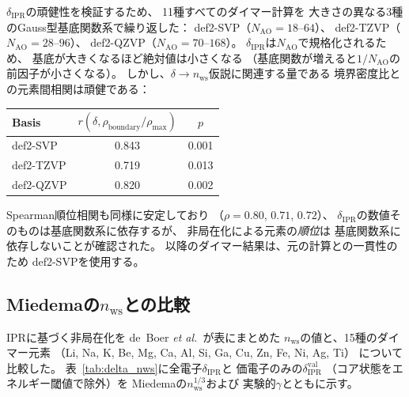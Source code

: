 \documentclass[twocolumn,showpacs,preprintnumbers,amsmath,amssymb,prb]{revtex4-2}
\begin{document}
$\delta_\mathrm{IPR}$の頑健性を検証するため、
11種すべてのダイマー計算を
大きさの異なる3種のGauss型基底関数系で繰り返した：
def2-SVP（$N_\mathrm{AO} = 18$--$64$）、
def2-TZVP（$N_\mathrm{AO} = 28$--$96$）、
def2-QZVP（$N_\mathrm{AO} = 70$--$168$）。
$\delta_\mathrm{IPR}$は$N_\mathrm{AO}$で規格化されるため、
基底が大きくなるほど絶対値は小さくなる
（基底関数が増えると$1/N_\mathrm{AO}$の前因子が小さくなる）。
しかし、$\delta \to n_\mathrm{ws}$仮説に関連する量である
境界密度比との元素間相関は頑健である：
\begin{center}
\begin{tabular}{lcc}
  Basis & $r(\delta, \rho_\mathrm{boundary}/\rho_\mathrm{max})$ & $p$ \\
  \hline
  def2-SVP  & 0.843 & 0.001 \\
  def2-TZVP & 0.719 & 0.013 \\
  def2-QZVP & 0.820 & 0.002 \\
\end{tabular}
\end{center}
Spearman順位相関も同様に安定しており
（$\rho = 0.80$, $0.71$, $0.72$）、
$\delta_\mathrm{IPR}$の数値そのものは基底関数系に依存するが、
非局在化による元素の\emph{順位}は
基底関数系に依存しないことが確認された。
以降のダイマー結果は、元の計算との一貫性のため
def2-SVPを使用する。

\subsection{Miedemaの$n_\mathrm{ws}$との比較}

IPRに基づく非局在化を
de~Boer \textit{et al.}~\cite{deBoer1988}が表にまとめた
$n_\mathrm{ws}$の値と、15種のダイマー元素
（Li, Na, K, Be, Mg, Ca, Al, Si, Ga, Cu, Zn, Fe, Ni, Ag, Ti）
について比較した。
表~\ref{tab:delta_nws}に全電子$\delta_\mathrm{IPR}$と
価電子のみの$\delta_\mathrm{IPR}^\mathrm{val}$
（コア状態をエネルギー閾値で除外）を
Miedemaの$n_\mathrm{ws}^{1/3}$および
実験的$\gamma$とともに示す。
\end{document}

